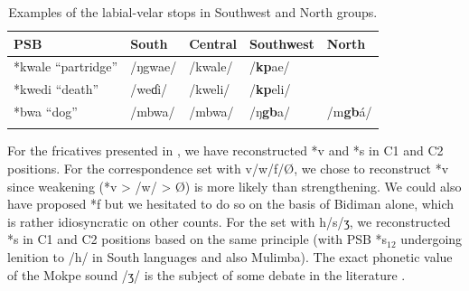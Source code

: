 \documentclass[output=paper,colorlinks,citecolor=brown
]{langscibook}
\begin{document}
\begin{table}
\caption{Examples of the labial-velar stops in Southwest and North groups.}
\label{tab:grollemundbrownrule:labiovelars}
 \begin{tabular}{lllll}
  \lsptoprule
\textbf{PSB}       & \textbf{South} & \textbf{Central} & \textbf{Southwest} & \textbf{North}     \\
\midrule
*kwale “partridge” & /ŋgwae/        & /kwale/          & /\textbf{kp}ae/             & {{}} \\
*kwedi “death”     & /weɗi/         & /kweli/          & /\textbf{kp}eli/            &                    \\
*bwa “dog”         & /mbwa/         & /mbwa/           & /ŋ\textbf{gb}a/             & /m\textbf{gb}á/      \\ 
   \lspbottomrule
 \end{tabular}
\end{table}

For the fricatives presented in , we have reconstructed *v and *s in C1 and C2 positions. For the correspondence set with v/w/f/Ø, we chose to reconstruct *v since weakening (*v > /w/ > Ø) is more likely than strengthening. We could also have proposed *f but we hesitated to do so on the basis of Bidiman alone, which is rather idiosyncratic on other counts. For the set with h/s/ʒ, we reconstructed *s in C1 and C2 positions based on the same principle (with PSB *s$_{12}$ undergoing lenition to /h/ in South languages and also Mulimba). The exact phonetic value of the Mokpe sound /ʒ/ is the subject of some debate in the literature \citep[9]{atindogbe2013}.
\end{document}
